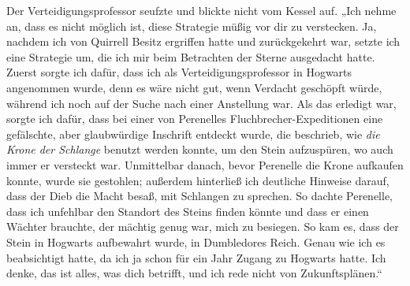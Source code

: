 Der Verteidigungsprofessor seufzte und blickte nicht vom Kessel auf.
„Ich nehme an, dass es nicht möglich ist, diese Strategie müßig vor dir zu verstecken. Ja, nachdem ich von Quirrell Besitz ergriffen hatte und zurückgekehrt war, setzte ich eine Strategie um, die ich mir beim Betrachten der Sterne ausgedacht hatte. Zuerst sorgte ich dafür, dass ich als Verteidigungsprofessor in Hogwarts angenommen wurde, denn es wäre nicht gut, wenn Verdacht geschöpft würde, während ich noch auf der Suche nach einer Anstellung war. Als das erledigt war, sorgte ich dafür, dass bei einer von Perenelles Fluchbrecher-Expeditionen eine gefälschte, aber glaubwürdige Inschrift entdeckt wurde, die beschrieb, wie \emph{die Krone der Schlange} benutzt werden konnte, um den Stein aufzuspüren, wo auch immer er versteckt war. Unmittelbar danach, bevor Perenelle die Krone aufkaufen konnte, wurde sie gestohlen; außerdem hinterließ ich deutliche Hinweise darauf, dass der Dieb die Macht besaß, mit Schlangen zu sprechen. So dachte Perenelle, dass ich unfehlbar den Standort des Steins finden könnte und dass er einen Wächter brauchte, der mächtig genug war, mich zu besiegen. So kam es, dass der Stein in Hogwarts aufbewahrt wurde, in Dumbledores Reich. Genau wie ich es beabsichtigt hatte, da ich ja schon für ein Jahr Zugang zu Hogwarts hatte. Ich denke, das ist alles, was dich betrifft, und ich rede nicht von Zukunftsplänen.“

